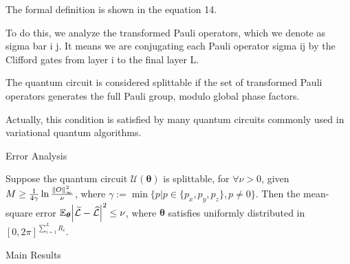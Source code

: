 \documentclass[10pt]{beamer}
\begin{document}
\begin{CJK}{UTF8}{gbsn}
{ The formal definition is shown in the equation 14.

 To do this, we analyze the transformed Pauli operators, which we denote as sigma bar i j. It means we are conjugating each Pauli operator sigma ij by the Clifford gates from layer i to the final layer L.

 The quantum circuit is considered splittable if the set of transformed Pauli operators generates the full Pauli group, modulo global phase factors.

 Actually, this condition is satisfied by many quantum circuits commonly used in variational quantum algorithms.
 }

\begin{frame}{Error Analysis}
  \begin{mdframed}
  \begin{lemma}\label{lemma:MSE_l}
 Suppose the quantum circuit $\mathcal{U}(\bm{\theta})$ is splittable, for $\forall\nu > 0$, given $M\geq\frac{1}{4\gamma}\ln{\frac{\norm{O}_\infty^2}{\nu}}$, where $\gamma:=\min\{p|{p \in \{p_x,p_y,p_z\},p\neq 0}\}$. Then the mean-square error $\mathbb{E}_{\bm{\theta}}\abs{\widetilde{\mathcal{L}}-\widehat{\mathcal{L}}}^2 \leq \nu$, where $\bm{\theta}$ satisfies uniformly distributed in $[0,2\pi]^{\sum_{i=1}^{L}R_i}$.
  \end{lemma}
  \end{mdframed}
\end{frame}

\begin{frame}[fragile]{Main Results}


\end{frame}
\end{CJK}
\end{document}
